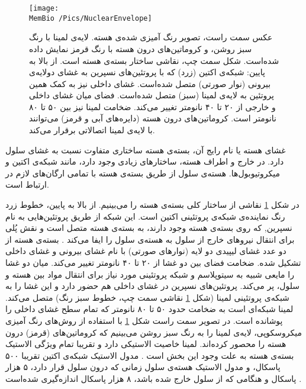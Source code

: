 

\begin{figure}[t]
\begin{center}
\texttt{[image: \\MemBio /Pics/NuclearEnvelope]}
\caption{
عکس سمت راست، تصویر رنگ آمیزی شده‌ی هسته. لایه‌ی لمینا با رنگ سبز روشن، و کروماتین‌های درون هسته با رنگ قرمز نمایش داده‌ شده‌است. شکل سمت چپ، نقاشی ساختار بسته‌ی هسته است. از بالا به پایین: شبکه‌ی اکتین (زرد) که با پروتئین‌های نسپرین به غشای دولایه‌ی بیرونی (نوار صورتی) متصل شده‌است. غشای داخلی نیز به کمک همین پروتئین به لایه‌ی لمینا (سبز) متصل شده‌است. فضای میان غشای داخلی و خارجی از ۲۰ تا ۴۰ نانومتر تغییر می‌کند. ضخامت لمینا نیز بین ۵۰ تا ۸۰ نانومتر است. کروماتین‌های درون هسته (دایره‌های آبی و قرمز) می‌توانند با لایه‌ی لمینا اتصالاتی برقرار می‌کند. 
}
\label{fig:nuclearenvelope}
\end{center}
\end{figure}


غشای هسته یا نام رایج آن، بسته‌ی هسته
ساختاری متفاوت نسبت به غشای سلول دارد. در خارج و اطراف هسته، ساختارهای زیادی وجود دارد، مانند شبکه‌ی اکتین
 و میکروتیوبول‌ها.
 هسته‌ی سلول از طریق بسته‌ی هسته با تمامی‌ ارگان‌های لازم در ارتباط است.

در شکل 
\ref{fig:nuclearenvelope}
نقاشی از ساختار کلی بسته‌ی هسته را می‌بینیم. از بالا به پایین، خطوط زرد رنگ نماینده‌ی شبکه‌ی پروتئینی اکتین است. این شبکه از طریق پروتئین‌هایی به نام نسپرین,
 که روی بسته‌ی هسته وجود دارند، به بسته‌ی هسته متصل است و نقش پُلی برای انتقال نیرو‌های خارج از سلول به هسته‌ی سلول را ایفا می‌کند
\cite{Lammerding2011}. 
بسته‌ی هسته از دو عدد غشای لیپیدی دو لایه (نوارهای صورتی) با نام غشای بیرونی و غشای داخلی تشکیل شده. ضخامت فضای بین دو غشا از ۲۰ تا ۴۰ نانومتر تغییر می‌کند. میان دو غشا را مایعی شبیه به سیتوپلاسم و شبکه‌ پروتئینی مورد نیاز برای انتقال مواد بین هسته و سلول، پر می‌کند. پروتئین‌های نسپرین  در غشای داخلی هم حضور دارد و این غشا را به شبکه‌ی پروتئینی لمینا
(شکل
\ref{fig:nuclearenvelope}
نقاشی سمت چپ، خطوط سبز‌ رنگ) متصل می‌کند. لمینا‌ شبکه‌ای است به ضخامت حدود ۵۰ تا ۸۰ نانومتر که تمام سطح غشای داخلی را پوشانده است. در تصویر سمت راست شکل 
\ref{fig:nuclearenvelope}
با استفاده از روش‌های رنگ آمیزی میکروسکوپی، لایه‌ی لمینا را به رنگ سبز روشن می‌بینیم که کروماتین‌های (قرمز) درون هسته را محصور کرده‌اند. لمینا خاصیت الاستیکی دارد و تقریبا تمام ویژگی الاستیک بسته‌ی هسته به علت وجود این بخش است
\cite{Steensel2017wd}.
مدول الاستیک شبکه‌ی اکتین تقریبا ۵۰۰ پاسکال، و مدول الاستیک هسته‌ی سلول زمانی که درون سلول قرار دارد، ۵ هزار پاسکال و هنگامی ‌که از سلول خارج شده باشد، ۸ هزار پاسکال اندازه‌گیری شده‌است
\cite{Dahl2004, CAILLE2002177}.








